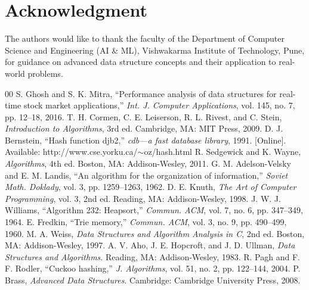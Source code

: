 \documentclass[conference]{IEEEtran}
\begin{document}
\section*{Acknowledgment}

The authors would like to thank the faculty of the Department of Computer Science and Engineering (AI \& ML), Vishwakarma Institute of Technology, Pune, for guidance on advanced data structure concepts and their application to real-world problems.

\begin{thebibliography}{00}
 S. Ghosh and S. K. Mitra, ``Performance analysis of data structures for real-time stock market applications,'' \textit{Int. J. Computer Applications}, vol. 145, no. 7, pp. 12--18, 2016.
 T. H. Cormen, C. E. Leiserson, R. L. Rivest, and C. Stein, \textit{Introduction to Algorithms}, 3rd ed. Cambridge, MA: MIT Press, 2009.
 D. J. Bernstein, ``Hash function djb2,'' \textit{cdb---a fast database library}, 1991. [Online]. Available: http://www.cse.yorku.ca/$\sim$oz/hash.html
 R. Sedgewick and K. Wayne, \textit{Algorithms}, 4th ed. Boston, MA: Addison-Wesley, 2011.
 G. M. Adelson-Velsky and E. M. Landis, ``An algorithm for the organization of information,'' \textit{Soviet Math. Doklady}, vol. 3, pp. 1259--1263, 1962.
 D. E. Knuth, \textit{The Art of Computer Programming}, vol. 3, 2nd ed. Reading, MA: Addison-Wesley, 1998.
 J. W. J. Williams, ``Algorithm 232: Heapsort,'' \textit{Commun. ACM}, vol. 7, no. 6, pp. 347--349, 1964.
 E. Fredkin, ``Trie memory,'' \textit{Commun. ACM}, vol. 3, no. 9, pp. 490--499, 1960.
 M. A. Weiss, \textit{Data Structures and Algorithm Analysis in C}, 2nd ed. Boston, MA: Addison-Wesley, 1997.
 A. V. Aho, J. E. Hopcroft, and J. D. Ullman, \textit{Data Structures and Algorithms}. Reading, MA: Addison-Wesley, 1983.
 R. Pagh and F. F. Rodler, ``Cuckoo hashing,'' \textit{J. Algorithms}, vol. 51, no. 2, pp. 122--144, 2004.
 P. Brass, \textit{Advanced Data Structures}. Cambridge: Cambridge University Press, 2008.
\end{thebibliography}
\end{document}
